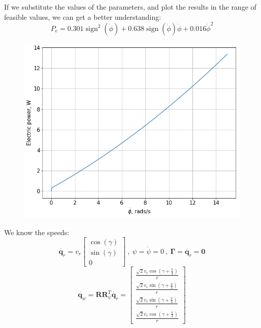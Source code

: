 \documentclass[12pt]{article}
\renewcommand{\vec}[1]{\bm{#1}}
\newcommand{\R}{\mathbb R}
\def\Torque{\vec \Gamma}
\def\R{\vec R}
\def\q{\vec q}
\begin{document}
If we substitute the values of the parameters, and plot the results in the range of feasible values, we can get a better understanding:
$$ P_e = 0.301 \operatorname{sign}^{2}\left(\dot{\phi}\right) + 0.638 \operatorname{sign}\left(\dot{\phi}\right) \dot{\phi} + 0.016 \dot{\phi}^{2}$$
\begin{figure}[h]
	\centering
	\includegraphics[width=.5\linewidth]{pe_phidot}
	\label{fig:pe_phidot}
\end{figure}

We know the speeds:
$$\dot{\q_r} = v_r\left[\begin{matrix}\operatorname{cos}\left(\gamma\right)\\\operatorname{sin}\left(\gamma\right)\\0\end{matrix}\right]\ ,\ \psi = \dot{\psi} = 0\ ,\ \Torque = \ddot{\q_r} = \vec{0}$$
$$ \dot{\q_w} = \R\R_{\psi}^T\dot{\q_r} = \left[\begin{matrix}\frac{\sqrt{2} v_{r} \operatorname{cos}\left(\gamma + \frac{\pi}{4}\right)}{r}\\\frac{\sqrt{2} v_{r} \operatorname{sin}\left(\gamma + \frac{\pi}{4}\right)}{r}\\\frac{\sqrt{2} v_{r} \operatorname{sin}\left(\gamma + \frac{\pi}{4}\right)}{r}\\\frac{\sqrt{2} v_{r} \operatorname{cos}\left(\gamma + \frac{\pi}{4}\right)}{r}\end{matrix}\right]$$
\end{document}

